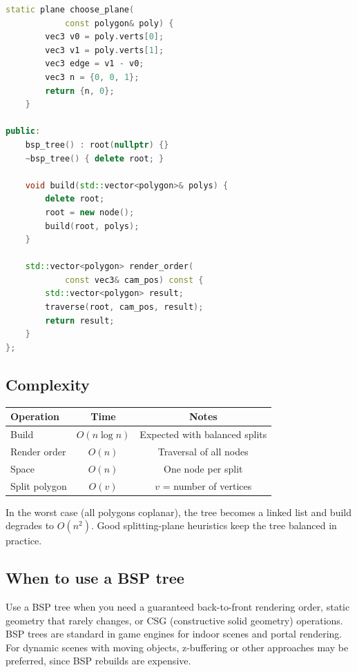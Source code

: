 \begin{lstlisting}[language=C++]
    static plane choose_plane(
            const polygon& poly) {
        vec3 v0 = poly.verts[0];
        vec3 v1 = poly.verts[1];
        vec3 edge = v1 - v0;
        vec3 n = {0, 0, 1};
        return {n, 0};
    }

public:
    bsp_tree() : root(nullptr) {}
    ~bsp_tree() { delete root; }

    void build(std::vector<polygon>& polys) {
        delete root;
        root = new node();
        build(root, polys);
    }

    std::vector<polygon> render_order(
            const vec3& cam_pos) const {
        std::vector<polygon> result;
        traverse(root, cam_pos, result);
        return result;
    }
};
\end{lstlisting}

\subsection{Complexity}

\begin{center}
\begin{tabular}{lcc}
\toprule
Operation & Time & Notes \\
\midrule
Build & $O(n \log n)$ & Expected with balanced splits \\
Render order & $O(n)$ & Traversal of all nodes \\
Space & $O(n)$ & One node per split \\
Split polygon & $O(v)$ & $v$ = number of vertices \\
\bottomrule
\end{tabular}
\end{center}

In the worst case (all polygons coplanar), the tree becomes a linked list and build degrades to $O(n^2)$. Good splitting-plane heuristics keep the tree balanced in practice.

\subsection{When to use a BSP tree}

Use a BSP tree when you need a guaranteed back-to-front rendering order, static geometry that rarely changes, or CSG (constructive solid geometry) operations. BSP trees are standard in game engines for indoor scenes and portal rendering. For dynamic scenes with moving objects, z-buffering or other approaches may be preferred, since BSP rebuilds are expensive.

